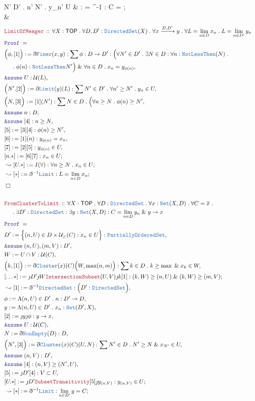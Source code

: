 \documentclass[12pt]{scrartcl}
\newcommand{\TYPE}[1]{\textcolor{NavyBlue}{\mathtt{#1}}}
\newcommand{\LOGIC}[1]{\textcolor{Blue}{\mathtt{#1}}}
\newcommand{\THM}[1]{\textcolor{Maroon}{\mathtt{#1}}}
\renewcommand{\.}{\; . \;}
\newcommand{\de}{: \kern 0.1pc =}
\newcommand{\Theorem}[2]{& \THM{#1} \, :: \, #2 \\ & \Proof = \\ }
\newcommand{\NewLine}{\\ & \kern 1pc}
\newcommand{\Page}[1]{ \begin{align*} #1 \end{align*}   }
\newcommand{ \bd }{ \ByDef }
\renewcommand{\And}{\; \& \;}
\newcommand{\Arrow}{\xrightarrow}
\newcommand{\Say}[3]{& #1 \de #2 : #3, \\}
\newcommand{\Conclude}[3]{& #1 \de #2 : #3; \\}
\newcommand{\Derive}[3]{& \leadsto #1 \de #2 : #3, \\}
\newcommand{\DeriveConclude}[3]{& \leadsto #1 \de #2 : #3 ; \\}
\newcommand{\Assume}[2]{& \LOGIC{Assume} \; #1 : #2, \\}
\newcommand{\QED}{\; \square}
\newcommand{\EndProof}{& \QED \\}
\newcommand{\ByDef}{\eth}
\newcommand{\ByConstr}{\jmath}
\newcommand{\Proof}{\LOGIC{Proof} \; }
\newcommand{\TOP}{\mathsf{TOP}}
\renewcommand{\U}{\mathcal{U}}
\begin{document}
{{		\forall N' \in D' \.
		\exists n' \ge N' \. y_{n'} \in U
	}
	\DeriveConclude{[*]}{\bd^{-1}\TYPE{Cluster}}{C = }
	\EndProof
}\Page{
	\Theorem{LimitOfMeager}
	{
		\forall X : \TOP \.
		\forall D,D' : \TYPE{DirectedSet}(X) \.
		\forall  x \Arrow{D,D'} y \.
		\forall L = \lim_{n \in D} x_n \.
		L = \lim_{n \in D'} y_n
	}
	\Say{\Big(\phi, [1] \Big)}{ \bd \TYPE{Finer}(x,y) }
	{
		\sum \phi : D \to D' : 
		\Big(\forall N' \in D' \. \exists N \in D : \forall n : \TYPE{NotLessThen}(N) \. \NewLine \.
			\phi(n) : \TYPE{NotLessThan} N'\Big) \And 
		\forall n \in D \.  x_n = y_{\phi(n)} 
	}
	\Assume{U}{\U(L)}
	\Say{\Big( N'. [2]\Big)}{\bd \TYPE{Limit}(y)(L) }
	{
		\sum N' \in D' \. \forall n' \ge N' \. y_n \in U   
	}
	\Say{\Big(N,[3]\Big)}{[1](N')}{
		\sum N \in D \.  \Big( 
		\forall n \ge N  \. 
		\phi(n) \ge N'
	}
	\Assume{n}{D}
	\Assume{[4]}{n \ge N}
	\Say{[5]}{[3][4]}{\phi(n) \ge N'}
	\Say{[6]}{[1](n)}{  y_{\phi(n)} = x_n   }
	\Say{[7]}{ [2][5]}{  y_{\phi(n)} \in U  }
	\Conclude{[n.*]}{[6][7]}{ x_n \in U  }
	\DeriveConclude{[U.*]}{ I(\forall) }{ 
		\forall n \ge N \. x_n \in U
	}
	\DeriveConclude{[*]}{\bd^{-1}\TYPE{Limit}}{L = \lim_{n \in D} x_n}
	\EndProof
	\\
	\Theorem{FromClusterToLimit}
	{
		\forall X : \TOP \.
		\forall D : \TYPE{DirectedSet} \.
		\forall x : \TYPE{Net}(X, D) \.
		\forall C = \overline{x} \. \NewLine \.
		\exists D' : \TYPE{DirectedSet} :
		\exists y  : \TYPE{Net}(X,D) : 
		C = \lim_{n \in D} y_n \And y \to x 
	}
	\Say{D'}{ \Big\{ (n,U) \in D \times \U_{\ge}(C) : x_n \in U \Big\}}
	{
		\TYPE{PartiallyOrderedSet}
	}
	\Assume{ (n,U),(m,V)  }{D'}
	\Say{W}{U \cap V}{ \U(C) }
	\Say{\Big(k,[1]\Big)}{\bd \TYPE{Cluster}(x)(C)\Big(W,\max(n,m)\Big)}
	{
		\sum k \in D \. k \ge \max \And x_k \in W
	}
	\Conclude{[\ldots*]}{\ByConstr D' \ByConstr W \THM{IntersectionSubset}(U,V) \ByConstr k[1]}
	{ (k,W) \ge (n,U) \And  (k,W) \ge (m,V)  }
	\Derive{[1]}{\bd^{-1} \TYPE{DirectedSet}}
	{
		\Big( D' : \TYPE{DirectedSet} \Big)   
	}
	\Say{\phi}{ \Lambda (n,U) \in D' \. n  }{D' \to D}
	\Say{y}{\Lambda (n,U) \in D' \. x_n }{\TYPE{Net}(D',X)}
	\Say{[2]}{\ByConstr y \ByConstr \phi}{ y \to x}
	\Assume{U}{\U(C)}
	\Say{N}{\bd \TYPE{NonEmpty}(D)}{D}
	\Say{\Big(N',[3]\Big)}{\bd \TYPE{Cluster}(x)(C)(U,N)}
	{
		\sum N' \in D \. N' \ge N \And x_{N'} \in U  
	}
	\Assume{(n,V)}{D'}
	\Assume{[4]}{(n,V) \ge (N',U)}
	\Say{[5]}{\ByConstr D' [4]}{  V \subset U  }
	\Conclude{[U.*]}{\ByConstr D' \THM{SubsetTransitivity}[5]\ByConstr y_{(n,V)}}
	{  y_{(n,V)} \in U  }
	\DeriveConclude{[*]}{\bd^{-1}\TYPE{Limit}}
	{
		\lim_{n \in D'} y = C
}}
\end{document}

